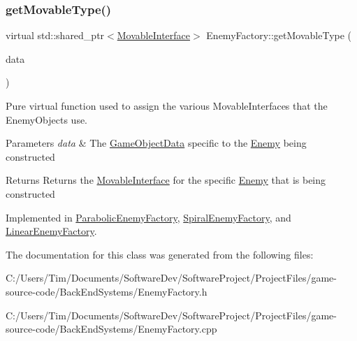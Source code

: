 \subsubsection{\texorpdfstring{get\+Movable\+Type()}{getMovableType()}}
{\footnotesize\ttfamily virtual std\+::shared\+\_\+ptr$<$\hyperlink{class_movable_interface}{Movable\+Interface}$>$ Enemy\+Factory\+::get\+Movable\+Type (\begin{DoxyParamCaption}\item[{const \hyperlink{struct_game_object_data}{Game\+Object\+Data} \&}]{data }\end{DoxyParamCaption})\hspace{0.3cm}{\ttfamily [pure virtual]}}



Pure virtual function used to assign the various Movable\+Interfaces that the Enemy\+Objects use. 


\begin{DoxyParams}{Parameters}
{\em data} & The \hyperlink{struct_game_object_data}{Game\+Object\+Data} specific to the \hyperlink{class_enemy}{Enemy} being constructed \\
\hline
\end{DoxyParams}
\begin{DoxyReturn}{Returns}
Returns the \hyperlink{class_movable_interface}{Movable\+Interface} for the specific \hyperlink{class_enemy}{Enemy} that is being constructed 
\end{DoxyReturn}


Implemented in \hyperlink{class_parabolic_enemy_factory_aaf1f3323e4c723f669a11c20a7e38efe}{Parabolic\+Enemy\+Factory}, \hyperlink{class_spiral_enemy_factory_aa05ff998b19ec4ef7ddd86ff24f70cba}{Spiral\+Enemy\+Factory}, and \hyperlink{class_linear_enemy_factory_ad8b2931b7f31f9f8e13d3c9d804469bf}{Linear\+Enemy\+Factory}.



The documentation for this class was generated from the following files\+:\begin{DoxyCompactItemize}
\item 
C\+:/\+Users/\+Tim/\+Documents/\+Software\+Dev/\+Software\+Project/\+Project\+Files/game-\/source-\/code/\+Back\+End\+Systems/Enemy\+Factory.\+h\item 
C\+:/\+Users/\+Tim/\+Documents/\+Software\+Dev/\+Software\+Project/\+Project\+Files/game-\/source-\/code/\+Back\+End\+Systems/Enemy\+Factory.\+cpp\end{DoxyCompactItemize}
